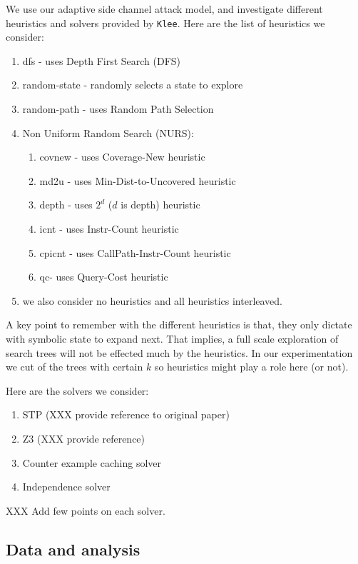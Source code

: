 \documentclass[11pt,a4paper,notitlepage]{article}
\begin{document}
We use our adaptive side channel attack model, and investigate different heuristics and solvers provided by \texttt{Klee}.
Here are the list of heuristics we consider:
\begin{enumerate}
\item dfs - uses Depth First Search (DFS)
\item random-state - randomly selects a state to explore
\item random-path - uses Random Path Selection
\item Non Uniform Random Search (NURS):
  \begin{enumerate}
  \item covnew - uses Coverage-New heuristic
  \item md2u - uses Min-Dist-to-Uncovered heuristic
  \item depth - uses $2^d$ ($d$ is depth) heuristic
  \item icnt - uses Instr-Count heuristic
  \item cpicnt - uses CallPath-Instr-Count heuristic
  \item qc- uses Query-Cost heuristic
  \end{enumerate}
\item we also consider no heuristics and all heuristics interleaved.
\end{enumerate}

A key point to remember with the different heuristics is that, they only dictate with symbolic state to expand next.
That implies, a full scale exploration of search trees will not be effected much by the heuristics.
In our experimentation we cut of the trees with certain $k$ so heuristics might play a role here (or not).

Here are the solvers we consider:
\begin{enumerate}
\item STP (XXX provide reference to original paper)
\item Z3 (XXX provide reference)
\item Counter example  caching solver
\item Independence solver
\end{enumerate}

XXX Add few points on each solver.

\subsection{Data and analysis}
\label{subsec:dataandanalysis}
\end{document}
